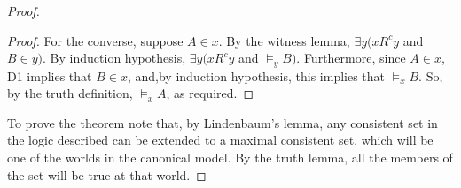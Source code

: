 \begin{proof}
\begin{proof}
For the converse, suppose $A{\in}x$. By the witness lemma, $\exists y (xR^cy$ and $B{\in}y)$. By induction hypothesis, $\exists y( xR^cy$ and ${\models_y}B)$. Furthermore, since $A{\in}x$, D1 implies that $B{\in}x$, and,by induction hypothesis, this implies that $\models _x B$. So, by the truth definition, $\models _x A$, as required.
\end{proof}
To prove the theorem note that, by Lindenbaum's lemma, any consistent set in the logic described can be extended to a maximal consistent set, which will be one of the worlds in the canonical model. By the truth lemma, all the members of the set will be true at that world. 
\end{proof}
